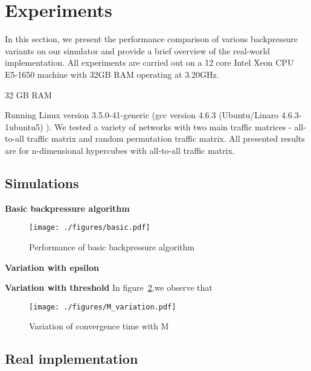 \label{experiments}
\section{Experiments}

In this section, we present the performance comparison of various backpressure variants on our simulator and provide a brief overview of the real-world implementation. All experiments are carried out on a 12 core Intel Xeon CPU E5-1650 machine with 32GB RAM operating at 3.20GHz.



32 GB RAM

Running  Linux version 3.5.0-41-generic
(gcc version 4.6.3 (Ubuntu/Linaro 4.6.3-1ubuntu5) ). We tested a variety of networks with two main traffic matrices - all-to-all traffic matrix and random permutation traffic matrix. All presented results are for n-dimensional hypercubes with all-to-all traffic matrix.

\subsection{Simulations}

\textbf{Basic backpressure algorithm}
\begin{figure}
\texttt{[image: ./figures/basic.pdf]}
\caption{\small Performance of basic backpressure algorithm}
\label{fig:M_1}
\end{figure}

\textbf{Variation with epsilon}

\textbf{Variation with threshold}
In figure~\ref{fig:M_1},we observe that 
\begin{figure}
\texttt{[image: ./figures/M\_variation.pdf]}
\caption{\small Variation of convergence time with M}
\label{fig:M_1}
\end{figure}


\subsection{Real implementation}

